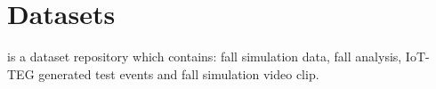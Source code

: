 \documentclass[10pt,journal,compsoc]{IEEEtran}
\begin{document}










%


\appendices
\section{Datasets}
\cite{FallRepo} is a dataset repository which contains: fall simulation data, fall analysis, IoT-TEG generated test events and fall simulation video clip.
\end{document}
